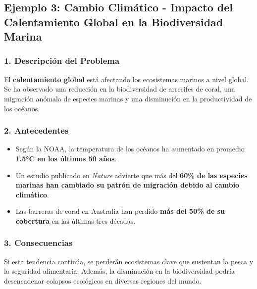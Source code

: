 \documentclass[
  letterpaper,
  DIV=11,
  numbers=noendperiod]{scrartcl}
\providecommand{\tightlist}{%
  \setlength{\itemsep}{0pt}\setlength{\parskip}{0pt}}
\begin{document}
\subsection{\texorpdfstring{Ejemplo 3: \textbf{Cambio Climático -
Impacto del Calentamiento Global en la Biodiversidad
Marina}}{Ejemplo 3: Cambio Climático - Impacto del Calentamiento Global en la Biodiversidad Marina}}\label{ejemplo-3-cambio-climuxe1tico---impacto-del-calentamiento-global-en-la-biodiversidad-marina}

\subsubsection{\texorpdfstring{\textbf{1. Descripción del
Problema}}{1. Descripción del Problema}}\label{descripciuxf3n-del-problema-2}

El \textbf{calentamiento global} está afectando los ecosistemas marinos
a nivel global. Se ha observado una reducción en la biodiversidad de
arrecifes de coral, una migración anómala de especies marinas y una
disminución en la productividad de los océanos.

\subsubsection{\texorpdfstring{\textbf{2.
Antecedentes}}{2. Antecedentes}}\label{antecedentes-2}

\begin{itemize}
\tightlist
\item
  Según la NOAA, la temperatura de los océanos ha aumentado en promedio
  \textbf{1.5°C en los últimos 50 años}.\\
\item
  Un estudio publicado en \emph{Nature} advierte que más del
  \textbf{60\% de las especies marinas han cambiado su patrón de
  migración debido al cambio climático}.\\
\item
  Las barreras de coral en Australia han perdido \textbf{más del 50\% de
  su cobertura} en las últimas tres décadas.
\end{itemize}

\subsubsection{\texorpdfstring{\textbf{3.
Consecuencias}}{3. Consecuencias}}\label{consecuencias-2}

Si esta tendencia continúa, se perderán ecosistemas clave que sustentan
la pesca y la seguridad alimentaria. Además, la disminución en la
biodiversidad podría desencadenar colapsos ecológicos en diversas
regiones del mundo.
\end{document}
